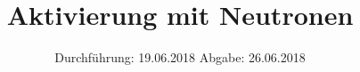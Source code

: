

\subject{VERSUCH 702}
\title{Aktivierung mit Neutronen}
\date{%
  Durchführung: 19.06.2018
  \hspace{3em}
  Abgabe: 26.06.2018
}



\maketitle
\thispagestyle{empty}
\tableofcontents
\newpage







\printbibliography{}


